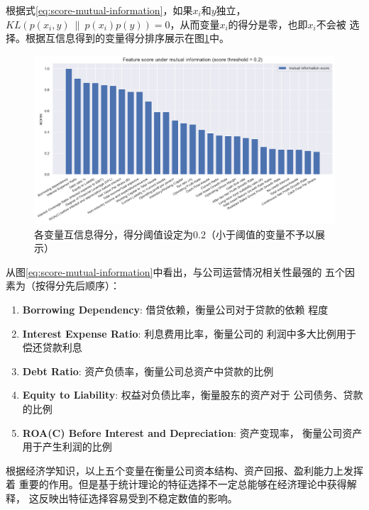 根据式\ref{eq:score-mutual-information}，如果$x_i$和$y$独立，
$KL(p(x_i,y)\ \|\ p(x_i)p(y))=0$，从而变量$x_i$的得分是零，也即$x_i$不会被
选择。根据互信息得到的变量得分排序展示在图\ref{fig:score-mutual-info}中。
\begin{figure}[ht]
    \centering
    \includegraphics[width=.8\textwidth]{images/score_mutual_info.png}
    \caption{各变量互信息得分，得分阈值设定为0.2（小于阈值的变量不予以展示）}
    \label{fig:score-mutual-info}
\end{figure}
从图\ref{eq:score-mutual-information}中看出，与公司运营情况相关性最强的
五个因素为（按得分先后顺序）：
\begin{enumerate}
    \item \textbf{Borrowing Dependency}: 借贷依赖，衡量公司对于贷款的依赖
    程度
    \item \textbf{Interest Expense Ratio}: 利息费用比率，衡量公司的
    利润中多大比例用于偿还贷款利息
    \item \textbf{Debt Ratio}: 资产负债率，衡量公司总资产中贷款的比例
    \item \textbf{Equity to Liability}: 权益对负债比率，衡量股东的资产对于
    公司债务、贷款的比例
    \item \textbf{ROA(C) Before Interest and Depreciation}: 资产变现率，
    衡量公司资产用于产生利润的比例
\end{enumerate}
根据经济学知识，以上五个变量在衡量公司资本结构、资产回报、盈利能力上发挥着
重要的作用。但是基于统计理论的特征选择不一定总能够在经济理论中获得解释，
这反映出特征选择容易受到不稳定数值的影响。

